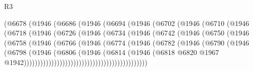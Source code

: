 \begin{lexlean}{R3}
\begin{coremodule}
                    (@6678
                      (@1946
                        (@6686
                          (@1946
                            (@6694
                              (@1946
                                (@6702
                                  (@1946
                                    (@6710
                                      (@1946
                                        (@6718
                                          (@1946
                                            (@6726
                                              (@1946
                                                (@6734
                                                  (@1946
                                                    (@6742
                                                      (@1946
                                                        (@6750
                                                          (@1946
                                                            (@6758
                                                              (@1946
                                                                (@6766
                                                                  (@1946
                                                                    (@6774
                                                                      (@1946
                                                                        (@6782
                                                                          (@1946
                                                                            (@6790
                                                                              (@1946
                                                                                (@6798
                                                                                  (@1946
                                                                                    (@6806
                                                                                      (@1946
                                                                                        (@6814
                                                                                          (@1946
                                                                                            (@6818
                                                                                              @6820
                                                                                              @1967
                                                                                              @1942)))))))))))))))))))))))))))))))))))))))))))))

\end{coremodule}
\end{lexlean}
